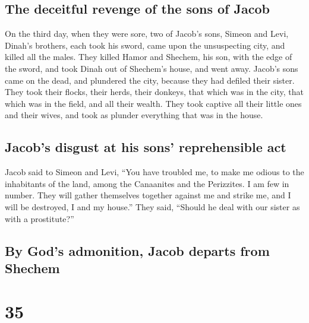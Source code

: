 \hypertarget{the-deceitful-revenge-of-the-sons-of-jacob}{%
\subsection{The deceitful revenge of the sons of
Jacob}\label{the-deceitful-revenge-of-the-sons-of-jacob}}

 On the third day, when they were sore, two of Jacob's
sons, Simeon and Levi, Dinah's brothers, each took his sword, came upon
the unsuspecting city, and killed all the males.  They
killed Hamor and Shechem, his son, with the edge of the sword, and took
Dinah out of Shechem's house, and went away.  Jacob's
sons came on the dead, and plundered the city, because they had defiled
their sister.  They took their flocks, their herds, their
donkeys, that which was in the city, that which was in the field,
 and all their wealth. They took captive all their little
ones and their wives, and took as plunder everything that was in the
house.

\hypertarget{jacobs-disgust-at-his-sons-reprehensible-act}{%
\subsection{Jacob's disgust at his sons' reprehensible
act}\label{jacobs-disgust-at-his-sons-reprehensible-act}}

 Jacob said to Simeon and Levi, ``You have troubled me,
to make me odious to the inhabitants of the land, among the Canaanites
and the Perizzites. I am few in number. They will gather themselves
together against me and strike me, and I will be destroyed, I and my
house.''  They said, ``Should he deal with our sister as
with a prostitute?''

\hypertarget{by-gods-admonition-jacob-departs-from-shechem}{%
\subsection{By God's admonition, Jacob departs from
Shechem}\label{by-gods-admonition-jacob-departs-from-shechem}}

\hypertarget{section-34}{%
\section{35}\label{section-34}}

